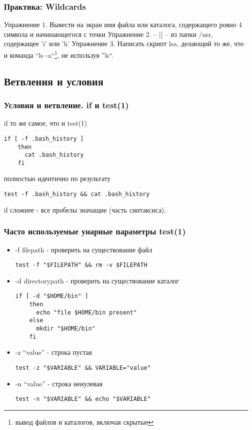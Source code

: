 \begin{frame}
  \frametitle{Практика: Wildcards}

  \alert{Упражнение 1.} Вывести на экран имя файла или каталога, содержащего ровно 4 символа и начинающегося с точки
  \pause
  \alert{Упражнение 2.} -- || --  из папки /usr, содержащее 'i' или 'h'
  \pause
  \alert{Упражнение 3.} Написать скрипт lsa, делающий то же, что и команда ``ls -a``\footnote{вывод файлов и каталогов, включая скрытые}, не используя ''ls``.
\end{frame}

\subsection{Ветвления и условия}

\begin{frame}[fragile]
  \frametitle{Условия и ветвление. if и test(1)}

  \alert{if то же самое, что и test(1)} \pause

\begin{lstlisting}[basicstyle=\normalsize]
	if [ -f .bash_history ]
	then
	  cat .bash_history
	fi
\end{lstlisting} 
      полностью идентично по результату
\begin{lstlisting}[basicstyle=\normalsize]
	test -f .bash_history && cat .bash_history
\end{lstlisting}
      if сложнее - все пробелы значащие (часть синтаксиса).
\end{frame}

\begin{frame}[fragile]
  \frametitle{Часто используемые унарные параметры test(1)}
  \begin{itemize}
    \item \alert{-f filepath} - проверить на существование файл
\begin{lstlisting}[basicstyle=\normalsize]
	test -f "$FILEPATH" && rm -v $FILEPATH
\end{lstlisting} \pause
    \item \alert{-d directorypath} - проверить на существование каталог
\begin{lstlisting}[basicstyle=\tiny]
	if [ -d "$HOME/bin" ]
	then 
	  echo "file $HOME/bin present"
	else
	  mkdir "$HOME/bin"
	fi
\end{lstlisting} \pause
    \item \alert{-z ``value''} - строка пустая
\begin{lstlisting}[basicstyle=\normalsize]
	test -z "$VARIABLE" && VARIABLE="value"
\end{lstlisting} \pause
    \item \alert{-n ``value''} - строка ненулевая
\begin{lstlisting}[basicstyle=\normalsize]
	test -n "$VARIABLE" && echo "$VARIABLE"
\end{lstlisting} 
  \end{itemize}

\end{frame}

